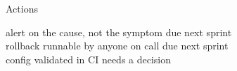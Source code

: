 \begin{frame}{Actions}
  \begin{console}
   alert on the cause, not the symptom \hfill due next sprint\\
   rollback runnable by anyone on call \hfill due next sprint\\
   config validated in CI \hfill needs a decision
  \end{console}
\end{frame}
